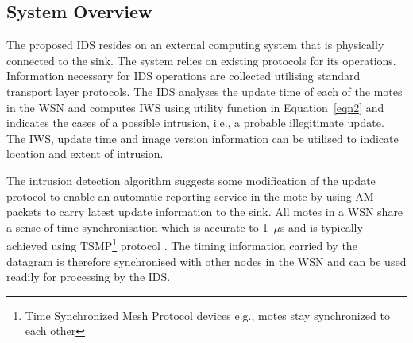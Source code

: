 \documentclass[conference]{IEEEtran}
\newcommand{\notedme}[1]{\raisebox{0pt}[0pt][0pt]{\pdfcomment[open=true,color=blue]{#1}}}
\begin{document}



\subsection*{System Overview}
\label{subsec:sysdeg}
The proposed IDS resides on an external computing system that is physically connected to the sink.
The system  relies on existing protocols for its operations.
Information necessary for IDS operations are collected utilising standard transport layer protocols. 
The IDS analyses the update time of  each of the motes in the WSN and computes IWS using utility function in Equation~\ref{eqn2} and indicates the cases of a possible intrusion, i.e., a probable illegitimate update.
The IWS, update time and image version information can be utilised to indicate location and extent of intrusion. 

The intrusion detection algorithm suggests some modification of the update protocol to enable an automatic reporting service in the mote by using AM packets to carry latest update information to the sink.
All motes in a WSN share a sense of time synchronisation which is accurate to 1~$\mu$s  and  is typically achieved using  TSMP\footnote{Time Synchronized Mesh Protocol devices e.g., motes stay synchronized to each other} protocol \cite{Pister08tsmp:time}.
The timing information carried by the datagram is therefore synchronised with other nodes in the WSN and can be used readily for processing by the IDS.
\end{document}
